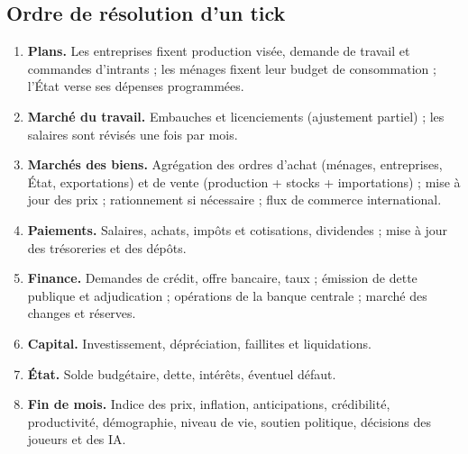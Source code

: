 \documentclass[11pt,a4paper]{article}
\begin{document}
\subsection{Ordre de résolution d'un tick}
\begin{enumerate}
\item \textbf{Plans.} Les entreprises fixent production visée, demande de travail et commandes d'intrants ; les ménages fixent leur budget de consommation ; l'État verse ses dépenses programmées.
\item \textbf{Marché du travail.} Embauches et licenciements (ajustement partiel) ; les salaires sont révisés une fois par mois.
\item \textbf{Marchés des biens.} Agrégation des ordres d'achat (ménages, entreprises, État, exportations) et de vente (production + stocks + importations) ; mise à jour des prix ; rationnement si nécessaire ; flux de commerce international.
\item \textbf{Paiements.} Salaires, achats, impôts et cotisations, dividendes ; mise à jour des trésoreries et des dépôts.
\item \textbf{Finance.} Demandes de crédit, offre bancaire, taux ; émission de dette publique et adjudication ; opérations de la banque centrale ; marché des changes et réserves.
\item \textbf{Capital.} Investissement, dépréciation, faillites et liquidations.
\item \textbf{État.} Solde budgétaire, dette, intérêts, éventuel défaut.
\item \textbf{Fin de mois.} Indice des prix, inflation, anticipations, crédibilité, productivité, démographie, niveau de vie, soutien politique, décisions des joueurs et des IA.
\end{enumerate}
\end{document}
